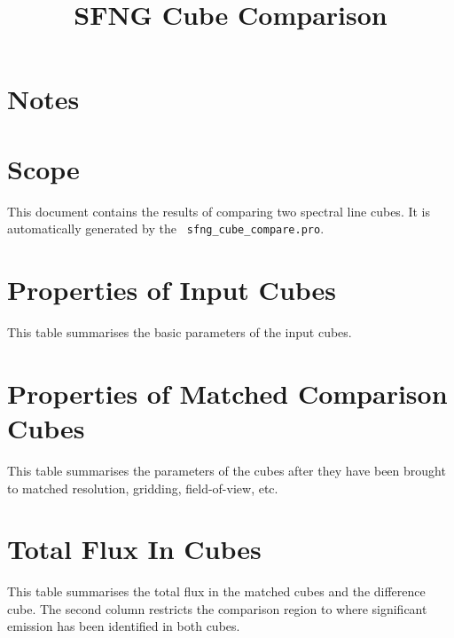 \documentclass[11pt]{article}
\begin{document}
\title{SFNG Cube Comparison}

\maketitle


\section{Notes}
\label{sect:notes}


\section{Scope}
\label{sec:scope}

\noindent  This document contains the results of comparing two spectral line
cubes. It is automatically generated by the {\tt
  sfng\_cube\_compare.pro}.

\section{Properties of Input Cubes}
\label{sect:input_cubes}
\noindent This table summarises the basic parameters of the input cubes.


\section{Properties of Matched Comparison Cubes}
\label{sect:match_cubes}
\noindent This table summarises the parameters of the cubes after they have been brought to matched resolution, gridding, field-of-view, etc.


\section{Total Flux In Cubes}
\label{sect:totflux}
\noindent  This table summarises the total flux in the matched cubes and the
difference cube. The second column restricts the comparison region to
where significant emission has been identified in both cubes.

\end{document}
